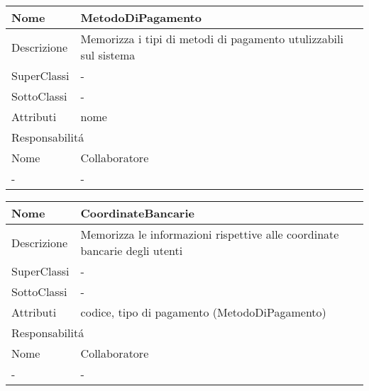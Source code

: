 \begin{center} %
    \begin{longtable}{ |p{3cm}|p{3cm}|p{3cm}|p{3cm}| }
        \hline
        Nome & \multicolumn{3}{|p{9cm}|}{MetodoDiPagamento} \\\hline
        Descrizione & \multicolumn{3}{|p{9cm}|}{Memorizza i tipi di metodi di pagamento utulizzabili sul sistema} \\\hline
        SuperClassi & \multicolumn{3}{|p{9cm}|}{-} \\\hline
        SottoClassi & \multicolumn{3}{|p{9cm}|}{-} \\\hline
        Attributi & \multicolumn{3}{|p{9cm}|}{nome} \\\hline
        \multicolumn{4}{|p{12cm}|}{Responsabilit\'a} \\\hline %
        \multicolumn{2}{|p{6cm}|}{Nome} & \multicolumn{2}{|p{6cm}|}{Collaboratore} \\\hline %
        \multicolumn{2}{|p{6cm}|}{-} & \multicolumn{2}{|p{6cm}|}{-} \\\hline
    \end{longtable}
\end{center}

\begin{center} %
    \begin{longtable}{ |p{3cm}|p{3cm}|p{3cm}|p{3cm}| }
        \hline
        Nome & \multicolumn{3}{|p{9cm}|}{CoordinateBancarie} \\\hline
        Descrizione & \multicolumn{3}{|p{9cm}|}{Memorizza le informazioni rispettive alle coordinate bancarie degli utenti} \\\hline
        SuperClassi & \multicolumn{3}{|p{9cm}|}{-} \\\hline
        SottoClassi & \multicolumn{3}{|p{9cm}|}{-} \\\hline
        Attributi & \multicolumn{3}{|p{9cm}|}{codice, tipo di pagamento (MetodoDiPagamento)} \\\hline
        \multicolumn{4}{|p{12cm}|}{Responsabilit\'a} \\\hline %
        \multicolumn{2}{|p{6cm}|}{Nome} & \multicolumn{2}{|p{6cm}|}{Collaboratore} \\\hline %
        \multicolumn{2}{|p{6cm}|}{-} & \multicolumn{2}{|p{6cm}|}{-} \\\hline
    \end{longtable}
\end{center}

